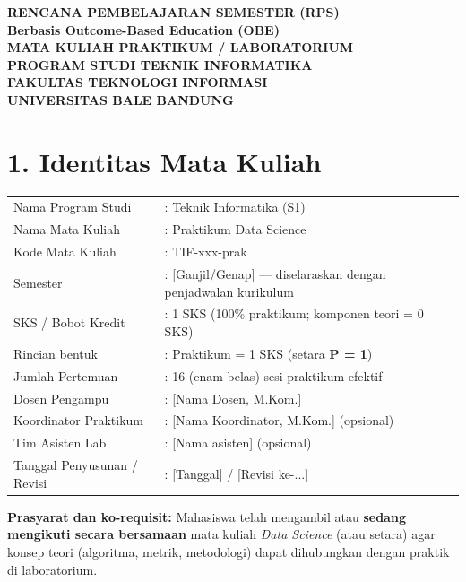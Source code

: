 \documentclass[12pt,a4paper]{article}
\begin{document}
\begin{center}
\textbf{\Large RENCANA PEMBELAJARAN SEMESTER (RPS)}\\
\textbf{Berbasis Outcome-Based Education (OBE)}\\[0.5cm]
\textbf{MATA KULIAH PRAKTIKUM / LABORATORIUM}\\[0.25cm]
\textbf{PROGRAM STUDI TEKNIK INFORMATIKA}\\
\textbf{FAKULTAS TEKNOLOGI INFORMASI}\\
\textbf{UNIVERSITAS BALE BANDUNG}\\
\end{center}

\vspace{0.75cm}

\section*{1. Identitas Mata Kuliah}

\begin{tabular}{ll}
Nama Program Studi & : Teknik Informatika (S1) \\
Nama Mata Kuliah & : Praktikum Data Science \\
Kode Mata Kuliah & : TIF-xxx-prak \\
Semester & : [Ganjil/Genap] --- diselaraskan dengan penjadwalan kurikulum \\
SKS / Bobot Kredit & : 1 SKS (100\% praktikum; komponen teori = 0 SKS) \\
Rincian bentuk & : Praktikum = 1 SKS (setara \textbf{P = 1}) \\
Jumlah Pertemuan & : 16 (enam belas) sesi praktikum efektif \\
Dosen Pengampu & : [Nama Dosen, M.Kom.] \\
Koordinator Praktikum & : [Nama Koordinator, M.Kom.] (opsional) \\
Tim Asisten Lab & : [Nama asisten] (opsional) \\
Tanggal Penyusunan / Revisi & : [Tanggal] / [Revisi ke-...] \\
\end{tabular}

\vspace{0.45cm}

\noindent\textbf{Prasyarat dan ko-requisit:} Mahasiswa telah mengambil atau \textbf{sedang mengikuti secara bersamaan} mata kuliah \textit{Data Science} (atau setara) agar konsep teori (algoritma, metrik, metodologi) dapat dihubungkan dengan praktik di laboratorium.
\end{document}
